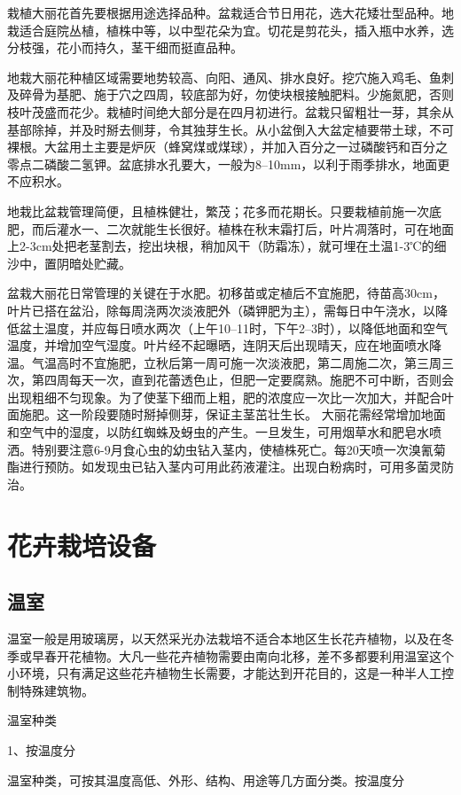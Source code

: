 \documentclass{ctexbook}
\begin{document}
栽植大丽花首先要根据用途选择品种。盆栽适合节日用花，选大花矮壮型品种。地栽适合庭院丛植，植株中等，以中型花朵为宜。切花是剪花头，插入瓶中水养，选分枝强，花小而持久，茎干细而挺直品种。
	
地栽大丽花种植区域需要地势较高、向阳、通风、排水良好。挖穴施入鸡毛、鱼刺及碎骨为基肥、施于穴之四周，较底部为好，勿使块根接触肥料。少施氮肥，否则枝叶茂盛而花少。栽植时间绝大部分是在四月初进行。盆栽只留粗壮一芽，其余从基部除掉，并及时掰去侧芽，令其独芽生长。从小盆倒入大盆定植要带土球，不可裸根。大盆用土主要是炉灰（蜂窝煤或煤球），并加入百分之一过磷酸钙和百分之零点二磷酸二氢钾。盆底排水孔要大，一般为8--10mm，以利于雨季排水，地面更不应积水。

地栽比盆栽管理简便，且植株健壮，繁茂；花多而花期长。只要栽植前施一次底肥，而后灌水一、二次就能生长很好。植株在秋末霜打后，叶片凋落时，可在地面上2-3cm处把老茎割去，挖出块根，稍加风干（防霜冻），就可埋在土温1-3℃的细沙中，置阴暗处贮藏。

盆栽大丽花日常管理的关键在于水肥。初移苗或定植后不宜施肥，待苗高30cm，叶片已搭在盆沿，除每周浇两次淡液肥外（磷钾肥为主），需每日中午浇水，以降低盆土温度，并应每日喷水两次（上午10--11时，下午2--3时），以降低地面和空气温度，并增加空气湿度。叶片经不起曝晒，连阴天后出现晴天，应在地面喷水降温。气温高时不宜施肥，立秋后第一周可施一次淡液肥，第二周施二次，第三周三次，第四周每天一次，直到花蕾透色止，但肥一定要腐熟。施肥不可中断，否则会出现粗细不匀现象。为了使茎下细而上粗，肥的浓度应一次比一次加大，并配合叶面施肥。这一阶段要随时掰掉侧芽，保证主茎茁壮生长。
大丽花需经常增加地面和空气中的湿度，以防红蜘蛛及蚜虫的产生。一旦发生，可用烟草水和肥皂水喷洒。特别要注意6-9月食心虫的幼虫钻入茎内，使植株死亡。每20天喷一次溴氰菊酯进行预防。如发现虫已钻入茎内可用此药液灌注。出现白粉病时，可用多菌灵防治。

\section{花卉栽培设备}
\subsection{温室}
温室一般是用玻璃房，以天然采光办法栽培不适合本地区生长花卉植物，以及在冬季或早春开花植物。大凡一些花卉植物需要由南向北移，差不多都要利用温室这个小环境，只有满足这些花卉植物生长需要，才能达到开花目的，这是一种半人工控制特殊建筑物。

温室种类

1、按温度分

温室种类，可按其温度高低、外形、结构、用途等几方面分类。按温度分
\end{document}

